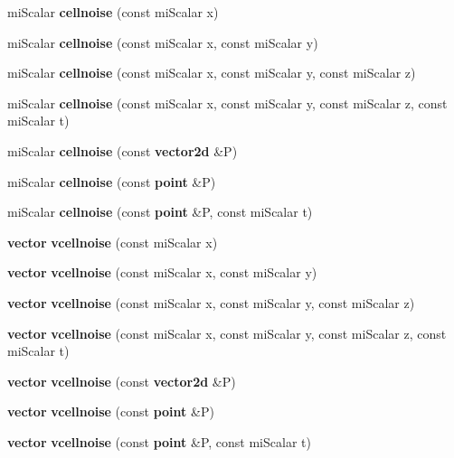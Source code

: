 \begin{CompactItemize}
mi\-Scalar {\bf cellnoise} (const mi\-Scalar x)
\item 
mi\-Scalar {\bf cellnoise} (const mi\-Scalar x, const mi\-Scalar y)
\item 
mi\-Scalar {\bf cellnoise} (const mi\-Scalar x, const mi\-Scalar y, const mi\-Scalar z)
\item 
mi\-Scalar {\bf cellnoise} (const mi\-Scalar x, const mi\-Scalar y, const mi\-Scalar z, const mi\-Scalar t)
\item 
mi\-Scalar {\bf cellnoise} (const {\bf vector2d} \&P)
\item 
mi\-Scalar {\bf cellnoise} (const {\bf point} \&P)
\item 
mi\-Scalar {\bf cellnoise} (const {\bf point} \&P, const mi\-Scalar t)
\item 
{\bf vector} {\bf vcellnoise} (const mi\-Scalar x)
\item 
{\bf vector} {\bf vcellnoise} (const mi\-Scalar x, const mi\-Scalar y)
\item 
{\bf vector} {\bf vcellnoise} (const mi\-Scalar x, const mi\-Scalar y, const mi\-Scalar z)
\item 
{\bf vector} {\bf vcellnoise} (const mi\-Scalar x, const mi\-Scalar y, const mi\-Scalar z, const mi\-Scalar t)
\item 
{\bf vector} {\bf vcellnoise} (const {\bf vector2d} \&P)
\item 
{\bf vector} {\bf vcellnoise} (const {\bf point} \&P)
\item 
{\bf vector} {\bf vcellnoise} (const {\bf point} \&P, const mi\-Scalar t)
\end{CompactItemize}
